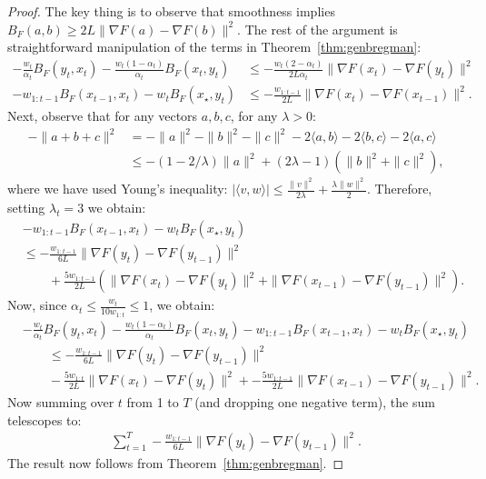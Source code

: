 \documentclass{article}
\begin{document}
\begin{proof}
    The key thing is to observe that smoothness implies $B_F(a,b) \ge 2L \|\nabla F(a) -\nabla F(b)\|^2$. The rest of the argument is straightforward manipulation of the terms in Theorem~\ref{thm:genbregman}:
    \begin{align*}
        -\frac{w_t}{\alpha_t}B_F(y_t,x_t) - \frac{w_t(1-\alpha_t)}{\alpha_t}B_F(x_t, y_t)&\le -\frac{w_t(2-\alpha_t)}{2L \alpha_t}\|\nabla F(x_t)-\nabla F(y_t)\|^2\\
        - w_{1:t-1} B_F(x_{t-1},x_t) - w_t B_F(x_\star, y_t)&\le -\frac{w_{1:t-1}}{2L} \|\nabla F(x_t)-\nabla F(x_{t-1})\|^2.
    \end{align*}
    Next, observe that for any vectors $a,b,c$, for any $\lambda>0$:
    \begin{align*}
        -\|a+b+c\|^2 &=-\|a\|^2 -  \|b\|^2 - \|c\|^2 - 2\langle  a,b\rangle - 2\langle b,c\rangle - 2\langle a,c\rangle\\
        &\le -(1-2/\lambda)\|a\|^2 + (2\lambda-1)(\|b\|^2 + \|c\|^2),
    \end{align*}
    where we have used Young's inequality: $|\langle v,w\rangle|\le \frac{\|v\|^2}{2\lambda} + \frac{\lambda \|w\|^2}{2}$. Therefore, setting $\lambda_t=3$ we obtain:
    \begin{align*}
        &- w_{1:t-1} B_F(x_{t-1},x_t) - w_t B_F(x_\star, y_t)\\
        &\le -\frac{w_{1:t-1}}{6L} \|\nabla F(y_t)-\nabla F(y_{t-1})\|^2 \\
        &\qquad+ \frac{5w_{1:t-1}}{2L}(\|\nabla F(x_t) - \nabla F(y_t)\|^2 + \|\nabla F(x_{t-1}) - \nabla F(y_{t-1})\|^2) .
    \end{align*}
    Now, since $\alpha_t \le \frac{w_t}{10 w_{1:t}}\le 1$, we obtain:
    \begin{align*}
        &-\frac{w_t}{\alpha_t}B_F(y_t,x_t) - \frac{w_t(1-\alpha_t)}{\alpha_t}B_F(x_t, y_t)- w_{1:t-1} B_F(x_{t-1},x_t) - w_t B_F(x_\star, y_t)\\
        &\qquad \le -\frac{w_{1:t-1}}{6L} \|\nabla F(y_t)-\nabla F(y_{t-1})\|^2 \\
        &\qquad - \frac{5w_{1:t}}{2L}\|\nabla F(x_t)-\nabla F(y_t)\|^2+- \frac{5w_{1:t-1}}{2L} \|\nabla F(x_{t-1}) - \nabla F(y_{t-1})\|^2.
    \end{align*}
    Now summing over $t$ from 1 to $T$ (and dropping one negative term), the sum telescopes to:
    \begin{align*}
        \sum_{t=1}^T -\frac{w_{1:t-1}}{6L} \|\nabla F(y_t)-\nabla F(y_{t-1})\|^2.
    \end{align*}
    The result now follows from Theorem~\ref{thm:genbregman}.
\end{proof}
\end{document}
